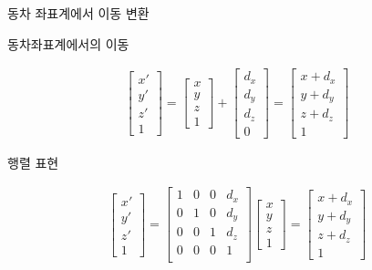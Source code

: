 \begin{frame}{동차 좌표계에서 이동 변환}

동차좌표계에서의 이동

\begin{eqnarray}
\left [
\begin{array}{c}
x' \\y' \\ z' \\ 1
\end{array}
\right ]
=
\left [
\begin{array}{c}
x \\ y \\ z \\ 1
\end{array}
\right ]
+
\left [
\begin{array}{c}
d_x \\ d_y \\ d_z \\ 0
\end{array}
\right ]
=
\left [
\begin{array}{c}
x+d_x \\ y+d_y \\ z+d_z \\ 1
\end{array}
\right ] \nonumber
\end{eqnarray}


행렬 표현


\begin{eqnarray}
\left [
\begin{array}{c}
x' \\y' \\ z' \\ 1
\end{array}
\right ]
=
\left [
\begin{array}{cccc}
1 & 0 & 0 & d_x \\
0 & 1 & 0 & d_y \\
0 & 0 & 1 & d_z \\
0 & 0 & 0 & 1 \\
\end{array}
\right ]
\left [
\begin{array}{c}
x \\ y \\ z \\ 1
\end{array}
\right ]
=
\left [
\begin{array}{c}
x+d_x \\ y+d_y \\ z+d_z \\ 1
\end{array}
\right ] \nonumber
\end{eqnarray}


\end{frame}

